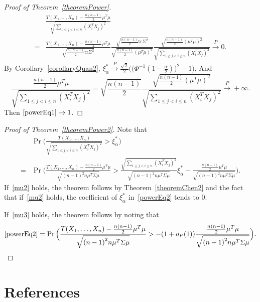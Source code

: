 \documentclass[review]{elsarticle}
\theoremstyle{plain}
\theoremstyle{definition}
\theoremstyle{remark}
\begin{document}
\begin{proof}[Proof of Theorem~\ref{theoremPower}]
    \begin{equation*}
        \begin{aligned}
            &\frac{T( X_1,\ldots, X_n)-\frac{n(n-1)}{2}\mu^T\mu}{\sqrt{\sum_{1\leq j<i\leq n}{(X_i^T X_j)}^2}}        \\
            =&\frac{T( X_1,\ldots, X_n)-\frac{n(n-1)}{2}\mu^T\mu}{\sqrt{\frac{n(n-1)}{2}\mathrm{tr}\Sigma^2}}
            \frac{\sqrt{\frac{n(n-1)}{2}\mathrm{tr}\Sigma^2}}{\sqrt{\frac{n(n-1)}{2}{(\mu^T \mu)}^2}}        
            \frac{\sqrt{\frac{n(n-1)}{2}{(\mu^T \mu)}^2}}{\sqrt{\sum_{1\leq j<i\leq n}{(X_i^T X_j)}^2}}        
            \xrightarrow{P} 0.
        \end{aligned}
    \end{equation*}
    By Corollary~\ref{corollaryQuan2}, $\xi_{\alpha}^*\xrightarrow{P}\frac{\sqrt{2}}{2}\Big(\big(\Phi^{-1}(1-\frac{\alpha}{2})\big)^2-1\Big)$. And 
   $$
    \frac{\frac{n(n-1)}{2}\mu^T\mu}{\sqrt{\sum_{1\leq j<i\leq n}{(X_i^T X_j)}^2}}=
    \sqrt{\frac{n(n-1)}{2}}\frac{\sqrt{\frac{n(n-1)}{2}(\mu^T\mu)^2}}{\sqrt{\sum_{1\leq j<i\leq n}{(X_i^T X_j)}^2}}
    \xrightarrow{P}+\infty.
    $$ 
    Then $\eqref{powerEq1}\to 1$.


\end{proof}
\begin{proof}[Proof of Theorem~\ref{theoremPower2}]
    Note that
    \begin{align}
            &\Pr\Big(\frac{T( X_1,\ldots, X_n)}{\sqrt{\sum_{1\leq j<i\leq n}{(X_i^T X_j)}^2}}>\xi_{\alpha}^* \Big)\nonumber\\
            =&
            \Pr\Big(\frac{T( X_1,\ldots, X_n)-\frac{n(n-1)}{2}\mu^T\mu}{\sqrt{{(n-1)}^2 n \mu^T\Sigma\mu}}>
            \frac{\sqrt{\sum_{1\leq j<i\leq n}{{(X_i^T X_j)}^2}}}{\sqrt{{(n-1)}^2 n \mu^T\Sigma\mu}}\xi_{\alpha}^*-\frac{\frac{n(n-1)}{2}\mu^T\mu}{\sqrt{{(n-1)}^2 n \mu^T\Sigma\mu}} \Big).
            \label{powerEq2}
    \end{align}
    If~\eqref{mu2} holds, the theorem follows by Theorem~\ref{theoremChen2} and the fact that if~\eqref{mu2} holds, the coefficient of $\xi_\alpha^*$ in~\eqref{powerEq2} tends to $0$.

    If~\eqref{mu3} holds, the theorem follows by noting that
    \begin{equation*}
        \begin{aligned}
            \eqref{powerEq2}=
            \Pr\Big(\frac{T( X_1,\ldots, X_n)-\frac{n(n-1)}{2}\mu^T\mu}{\sqrt{{(n-1)}^2 n \mu^T\Sigma\mu}}>
            -(1+o_P(1))\frac{\frac{n(n-1)}{2}\mu^T\mu}{\sqrt{{(n-1)}^2 n \mu^T\Sigma\mu}} \Big).
        \end{aligned}
    \end{equation*}
\end{proof}



\section*{References}


\end{document}
